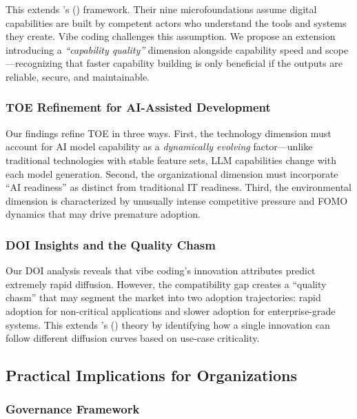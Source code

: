 \documentclass[preprint,12pt,authoryear]{elsarticle}
\begin{document}
This extends \citeauthor{Warner2019}'s (\citeyear{Warner2019}) framework. Their nine microfoundations assume digital capabilities are built by competent actors who understand the tools and systems they create. Vibe coding challenges this assumption. We propose an extension introducing a \emph{``capability quality''} dimension alongside capability speed and scope---recognizing that faster capability building is only beneficial if the outputs are reliable, secure, and maintainable.

\subsubsection{TOE Refinement for AI-Assisted Development}

Our findings refine TOE in three ways. First, the technology dimension must account for AI model capability as a \emph{dynamically evolving} factor---unlike traditional technologies with stable feature sets, LLM capabilities change with each model generation. Second, the organizational dimension must incorporate ``AI readiness'' as distinct from traditional IT readiness. Third, the environmental dimension is characterized by unusually intense competitive pressure and FOMO dynamics that may drive premature adoption.

\subsubsection{DOI Insights and the Quality Chasm}

Our DOI analysis reveals that vibe coding's innovation attributes predict extremely rapid diffusion. However, the compatibility gap creates a ``quality chasm'' that may segment the market into two adoption trajectories: rapid adoption for non-critical applications and slower adoption for enterprise-grade systems. This extends \citeauthor{Rogers2003}'s (\citeyear{Rogers2003}) theory by identifying how a single innovation can follow different diffusion curves based on use-case criticality.


\subsection{Practical Implications for Organizations}

\subsubsection{Governance Framework}
\end{document}

